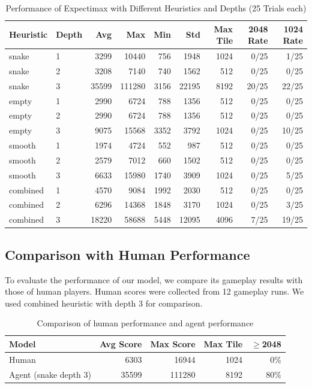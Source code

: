 \documentclass{article}
\begin{document}
\begin{table}[h]
\centering
\begin{tabular}{llrrrrrrr}
\toprule
Heuristic & Depth & Avg & Max & Min & Std & Max Tile & 2048 Rate & 1024 Rate \\
\midrule

snake & 1 & 3299 & 10440 & 756 & 1948 & 1024 & 0/25 & 1/25 \\
snake & 2 & 3208 & 7140 & 740 & 1562 & 512 & 0/25 & 0/25 \\
snake & 3 & 35599 & 111280 & 3156 & 22195 & 8192 & 20/25 & 22/25 \\

\midrule
empty & 1 & 2990 & 6724 & 788 & 1356 & 512 & 0/25 & 0/25 \\
empty & 2 & 2990 & 6724 & 788 & 1356 & 512 & 0/25 & 0/25 \\
empty & 3 & 9075 & 15568 & 3352 & 3792 & 1024 & 0/25 & 10/25 \\

\midrule
smooth & 1 & 1974 & 4724 & 552 & 987 & 512 & 0/25 & 0/25 \\
smooth & 2 & 2579 & 7012 & 660 & 1502 & 512 & 0/25 & 0/25 \\
smooth & 3 & 6633 & 15980 & 1740 & 3909 & 1024 & 0/25 & 5/25 \\

\midrule
combined & 1 & 4570 & 9084 & 1992 & 2030 & 512 & 0/25 & 0/25 \\
combined & 2 & 6296 & 14368 & 1848 & 3170 & 1024 & 0/25 & 3/25 \\
combined & 3 & 18220 & 58688 & 5448 & 12095 & 4096 & 7/25 & 19/25 \\

\bottomrule
\end{tabular}
\caption{Performance of Expectimax with Different Heuristics and Depths (25 Trials each)}
\end{table}

\subsection{Comparison with Human Performance}

To evaluate the performance of our model, we compare its gameplay results with those of human players.
Human scores were collected from 12 gameplay runs. We used combined heuristic with depth 3 for comparison.

\begin{table}[h]
\centering
\begin{tabular}{lrrrr}
\toprule
Model & Avg Score & Max Score & Max Tile & $\geq$2048 \\
\midrule
Human & 6303 & 16944 & 1024 & 0\% \\
Agent (snake depth 3) & 35599 & 111280 & 8192 & 80\% \\
\bottomrule
\end{tabular}
\caption{Comparison of human performance and agent performance}
\end{table}
\end{document}
